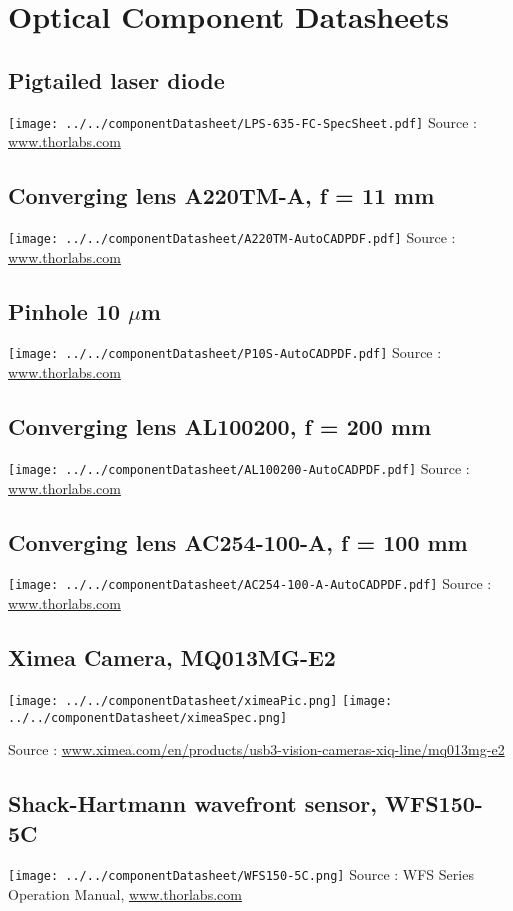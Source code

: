 
\chapter{Optical Component Datasheets}
\label{AppendixA} 

\section{Pigtailed laser diode}
\label{app:pigtailedLaserDiode}
\texttt{[image: ../../componentDatasheet/LPS-635-FC-SpecSheet.pdf]}
Source : \url{www.thorlabs.com}

\section{Converging lens A220TM-A, f = 11 mm}
\label{app:CL11}
\texttt{[image: ../../componentDatasheet/A220TM-AutoCADPDF.pdf]}
Source : \url{www.thorlabs.com}

\section{Pinhole 10 $\mu$m}
\label{app:pinhole10microns}
\texttt{[image: ../../componentDatasheet/P10S-AutoCADPDF.pdf]}
Source : \url{www.thorlabs.com}

\section{Converging lens AL100200, f = 200 mm}
\label{app:CL200}
\texttt{[image: ../../componentDatasheet/AL100200-AutoCADPDF.pdf]}
Source : \url{www.thorlabs.com}

\section{Converging lens AC254-100-A, f = 100 mm}
\label{app:CL100}
\texttt{[image: ../../componentDatasheet/AC254-100-A-AutoCADPDF.pdf]}
Source : \url{www.thorlabs.com}

\section{Ximea Camera, MQ013MG-E2}
\label{app:ximeaCam}
\begin{center}
\texttt{[image: ../../componentDatasheet/ximeaPic.png]}
\texttt{[image: ../../componentDatasheet/ximeaSpec.png]}
\end{center}
Source : \url{www.ximea.com/en/products/usb3-vision-cameras-xiq-line/mq013mg-e2}

\section{Shack-Hartmann wavefront sensor, WFS150-5C}
\label{app:SHwfs}
\texttt{[image: ../../componentDatasheet/WFS150-5C.png]}
Source : WFS Series Operation Manual, \url{www.thorlabs.com}